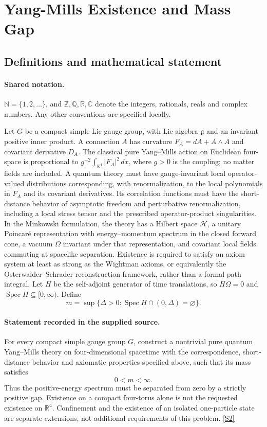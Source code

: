 \documentclass[11pt]{article}
\newcommand{\sref}[2]{\hyperlink{source:#1:#2}{[S#2]}}
\begin{document}
\section{Yang-Mills Existence and Mass Gap}\label{statement}

\subsection{Definitions and mathematical statement}

\paragraph{Shared notation.}$\mathbb N=\{1,2,\ldots\}$, and $\mathbb Z,\mathbb Q,\mathbb R,\mathbb C$ denote the integers, rationals, reals and complex numbers. Any other conventions are specified locally.


Let $G$ be a compact simple Lie gauge group, with Lie algebra $\mathfrak g$ and an invariant positive inner product. A connection $A$ has curvature $F_A=dA+A\wedge A$ and covariant derivative $D_A$. The classical pure Yang--Mills action on Euclidean four-space is proportional to $g^{-2}\int_{\mathbb R^4}|F_A|^2\,dx$, where $g>0$ is the coupling; no matter fields are included.
A quantum theory must have gauge-invariant local operator-valued distributions corresponding, with renormalization, to the local polynomials in $F_A$ and its covariant derivatives. Its correlation functions must have the short-distance behavior of asymptotic freedom and perturbative renormalization, including a local stress tensor and the prescribed operator-product singularities.
In the Minkowski formulation, the theory has a Hilbert space $\mathcal H$, a unitary Poincar\'e representation with energy--momentum spectrum in the closed forward cone, a vacuum $\Omega$ invariant under that representation, and covariant local fields commuting at spacelike separation. Existence is required to satisfy an axiom system at least as strong as the Wightman axioms, or equivalently the Osterwalder--Schrader reconstruction framework, rather than a formal path integral. Let $H$ be the self-adjoint generator of time translations, so $H\Omega=0$ and $\operatorname{Spec}H\subseteq[0,\infty)$. Define
\[
 m=\sup\{\Delta>0:\operatorname{Spec}H\cap(0,\Delta)=\varnothing\}.
\]
\paragraph{Statement recorded in the supplied source.}
For every compact simple gauge group $G$, construct a nontrivial pure quantum Yang--Mills theory on four-dimensional spacetime with the correspondence, short-distance behavior and axiomatic properties specified above, such that its mass satisfies
\[
 0<m<\infty.
\]
Thus the positive-energy spectrum must be separated from zero by a strictly positive gap. Existence on a compact four-torus alone is not the requested existence on $\mathbb R^4$. Confinement and the existence of an isolated one-particle state are separate extensions, not additional requirements of this problem. \sref{statement}{2}
\end{document}
